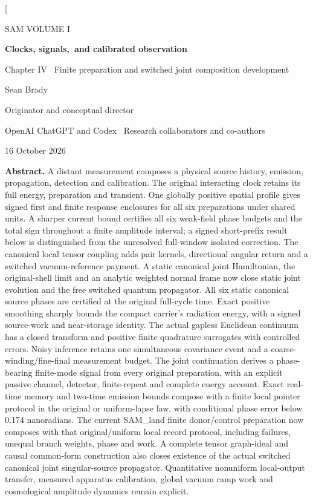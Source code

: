 \documentclass[10pt,twocolumn,letterpaper]{article}
\begin{document}
\raggedbottom
\twocolumn[{
\begin{center}
{\small SAM VOLUME I\par}\vspace{0.4em}
{\LARGE\bfseries Clocks, signals,\ and calibrated observation\par}\vspace{0.4em}
{\large Chapter IV \textbullet\ Finite preparation and switched joint composition development\par}\vspace{0.5em}
{\large Sean Brady\par}
{\small Originator and conceptual director\par}
{\small OpenAI ChatGPT and Codex \textbullet\ Research collaborators and co-authors\par}
{\small 16 October 2026\par}
\end{center}
\begin{minipage}{0.97\textwidth}
\noindent\textbf{Abstract.} A distant measurement composes a physical source history, emission, propagation, detection and calibration. The original interacting clock retains its full energy, preparation and transient. One globally positive spatial profile gives signed first and finite response enclosures for all six preparations under shared units. A sharper current bound certifies all six weak-field phase budgets and the total sign throughout a finite amplitude interval; a signed short-prefix result below is distinguished from the unresolved full-window isolated correction. The canonical local tensor coupling adds pair kernels, directional angular return and a switched vacuum-reference payment. A static canonical joint Hamiltonian, the original-shell limit and an analytic weighted normal frame now close static joint evolution and the free switched quantum propagator. All six static canonical source phases are certified at the original full-cycle time. Exact positive smoothing sharply bounds the compact carrier's radiation energy, with a signed source-work and near-storage identity. The actual gapless Euclidean continuum has a closed transform and positive finite quadrature surrogates with controlled errors. Noisy inference retains one simultaneous covariance event and a coarse-winding/fine-final measurement budget. The joint continuation derives a phase-bearing finite-mode signal from every original preparation, with an explicit passive channel, detector, finite-repeat and complete energy account. Exact real-time memory and two-time emission bounds compose with a finite local pointer protocol in the original or uniform-lapse law, with conditional phase error below 0.174 nanoradians. The current SAM\_land finite donor/control preparation now composes with that original/uniform local record protocol, including failures, unequal branch weights, phase and work. A complete tensor graph-ideal and causal common-form construction also closes existence of the actual switched canonical joint singular-source propagator. Quantitative nonuniform local-output transfer, measured apparatus calibration, global vacuum ramp work and cosmological amplitude dynamics remain explicit.

\end{minipage}}
\end{document}
